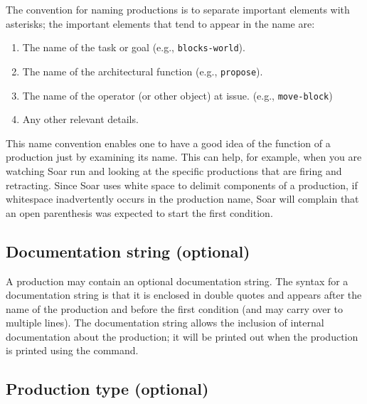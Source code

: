 The convention for naming productions is to separate important elements with asterisks; the important elements that tend to appear in the name are:

\vspace{-12pt}
\begin{enumerate}
\item The name of the task or goal (e.g., \texttt{blocks-world}).
	\vspace{-10pt}
\item The name of the architectural function (e.g., \texttt{propose}).
	\vspace{-10pt}
\item The name of the operator (or other object) at issue. (e.g., \texttt{move-block})
	\vspace{-10pt}
\item Any other relevant details.
	\vspace{-10pt}
\end{enumerate}

This name convention enables one to have a good idea of the function of a production just by examining its name. This can help, for example, when you are watching Soar run and looking at the specific productions that are firing and retracting.  Since Soar uses white space to delimit components of a production, if whitespace inadvertently occurs in the production name, Soar will complain that an open parenthesis was expected to start the first condition.

\subsection{Documentation string (optional)}

A production may contain an optional documentation string. The syntax for a documentation string is that it is enclosed in double quotes and appears after the name of the production and before the first condition (and may carry over to multiple lines). The documentation string allows the inclusion of internal documentation about the production; it will be printed out when the production is printed using the  command.

\subsection{Production type (optional)}

